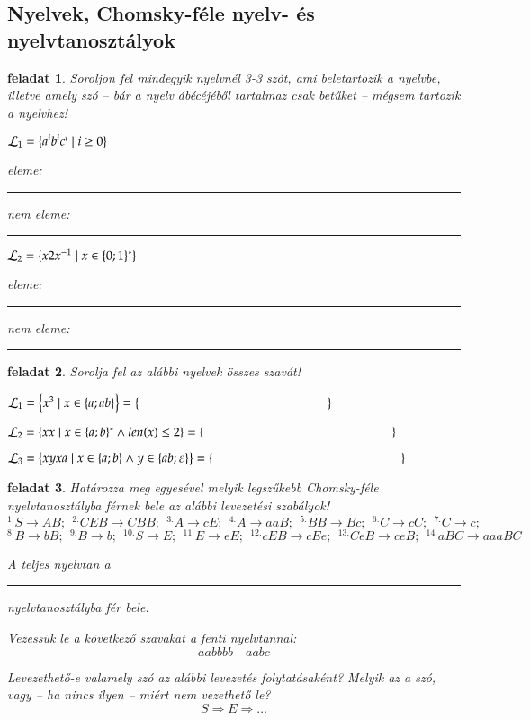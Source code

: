 \documentclass[a4paper]{article}
\newtheorem{feladat}{feladat}[section]
\newcommand{\spacer}[1][2 cm]{\rule{#1}{.4pt}\rule{0pt}{2em} }
\begin{document}
\newpage
\subsection{Nyelvek, Chomsky-féle nyelv- és nyelvtanosztályok}
\begin{feladat}
Soroljon fel mindegyik nyelvnél 3-3 szót, ami beletartozik a nyelvbe,
illetve amely szó -- bár a nyelv ábécéjéből tartalmaz csak betűket --
mégsem tartozik a nyelvhez!

${\cal L}_1 = \{a^ib^ic^i  \mid i\ge 0\}$

eleme: \spacer

nem eleme: \spacer

${\cal L}_2 = \{x2x^{-1} \mid x\in \{0; 1\}^*\}$

eleme: \spacer

nem eleme: \spacer
\end{feladat}

\begin{feladat}
Sorolja fel az alábbi nyelvek összes szavát!

${\cal L}_1 = \left\{x^3 \mid x\in \{a; ab\}\right\} = \{ \hspace{15em}  \}$

${\cal L}_2 = \left\{xx \mid x\in \{a; b\}^* \wedge  len(x) \le 2\right\} = \{
\hspace{15em}  \}$

${\cal L}_3 = \left\{xyxa \mid x\in \{a; b\} \wedge y\in \{ab;
\varepsilon\}\right\} = \{
\hspace{15em}  \}$
\end{feladat}

\begin{feladat}
Határozza meg egyesével melyik legszűkebb Chomsky-féle nyelvtanosztályba
férnek bele az alábbi levezetési szabályok!
\[ {}^{1.} S\rightarrow AB;\:\: {}^{2.} CEB\rightarrow CBB;\:\:
{}^{3.} A\rightarrow cE;\:\: {}^{4.} A\rightarrow aaB;\:\: {}^{5.} BB\rightarrow Bc;\:\: 
{}^{6.} C\rightarrow cC;\:\: {}^{7.} C\rightarrow c;\]
\[{}^{8.} B\rightarrow bB;\:\: {}^{9.} B\rightarrow b;\:\: {}^{10.} S\rightarrow E;\:\:
{}^{11.} E\rightarrow eE;\:\:  {}^{12.} cEB\rightarrow cEe;\:\:  {}^{13.} CeB\rightarrow ceB;\:\:
{}^{14.} aBC\rightarrow aaaBC\]

\vspace{3ex}
A teljes nyelvtan a \spacer[8em] nyelvtanosztályba fér bele.

Vezessük le a következő szavakat a fenti nyelvtannal:
\[aabbbb \quad aabc\]

\vspace{6em}

Levezethető-e valamely szó az alábbi levezetés folytatásaként? Melyik az
a szó, vagy -- ha nincs ilyen -- miért nem vezethető le?
\[S\Rightarrow E \Rightarrow \ldots\]
\end{feladat}
\end{document}
